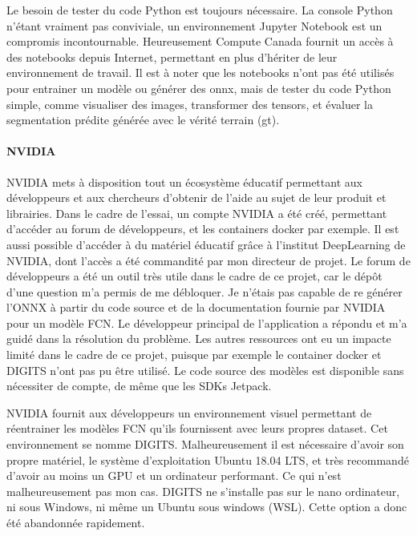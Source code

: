 \par Le besoin de tester du code Python est toujours nécessaire. La console Python n'étant vraiment pas conviviale, un environnement Jupyter Notebook est un compromis incontournable. Heureusement Compute Canada fournit un accès à des notebooks depuis Internet, permettant en plus d'hériter de leur environnement de travail. Il est à noter que les notebooks n'ont pas été utilisés pour entrainer un modèle ou générer des onnx, mais de tester du code Python simple, comme visualiser des images, transformer des tensors, et évaluer la segmentation prédite générée avec le vérité terrain (\acrshort{gt}). 
\paragraph{NVIDIA}
\par NVIDIA mets à disposition tout un écosystème éducatif permettant aux développeurs et aux chercheurs d'obtenir de l'aide au sujet de leur produit et librairies. Dans le cadre de l'essai, un compte NVIDIA a été créé, permettant d'accéder au forum de développeurs, et les containers  docker par exemple. Il est aussi possible d'accéder à du matériel éducatif grâce à l'institut DeepLearning de NVIDIA, dont l'accès a été commandité par mon directeur de projet. Le forum de développeurs a été un outil très utile dans le cadre de ce projet, car le dépôt d'une question m'a permis de me débloquer. Je n'étais pas capable de re générer l'ONNX à partir du code source et de la documentation fournie par NVIDIA pour un modèle FCN. Le développeur principal de l'application a répondu et m'a guidé dans la résolution du problème. Les autres ressources ont eu un impacte limité dans le cadre de ce projet, puisque par exemple le container docker et DIGITS n'ont pas pu être utilisé. Le code source des modèles est disponible sans nécessiter de compte, de même que les SDKs Jetpack.
\par NVIDIA fournit aux développeurs un environnement visuel permettant de réentrainer les modèles FCN qu'ils fournissent avec leurs propres dataset. Cet environnement se nomme DIGITS. Malheureusement il est nécessaire d'avoir son propre matériel, le système d'exploitation Ubuntu 18.04 LTS, et très recommandé d'avoir au moins un GPU et un ordinateur performant. Ce qui n'est malheureusement pas mon cas. DIGITS ne s'installe pas sur le nano ordinateur, ni sous Windows, ni même un Ubuntu sous windows (WSL). Cette option a donc été abandonnée rapidement. 
